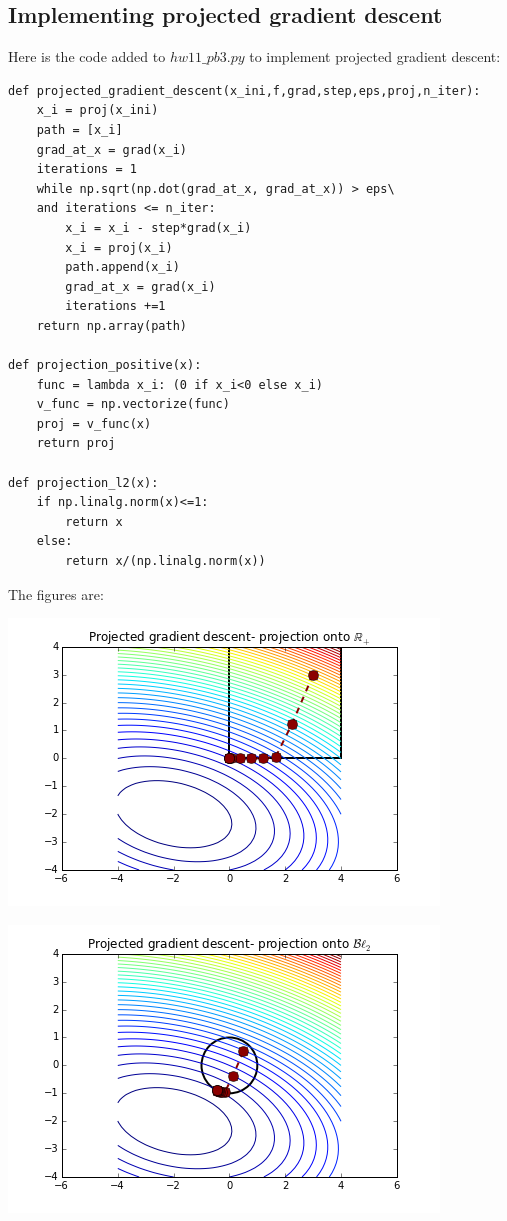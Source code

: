 \documentclass[paper=a4, fontsize=11pt]{scrartcl} %
\numberwithin{equation}{section} %
\numberwithin{figure}{section} %
\numberwithin{table}{section} %
\begin{document}
\subsection{Implementing projected gradient descent}

Here is the code added to $hw11\_pb3.py$ to implement projected gradient descent:
\begin{lstlisting}[frame=single, basicstyle=\small]
def projected_gradient_descent(x_ini,f,grad,step,eps,proj,n_iter):
    x_i = proj(x_ini)
    path = [x_i]
    grad_at_x = grad(x_i)
    iterations = 1
    while np.sqrt(np.dot(grad_at_x, grad_at_x)) > eps\
    and iterations <= n_iter:
        x_i = x_i - step*grad(x_i)
        x_i = proj(x_i)
        path.append(x_i)
        grad_at_x = grad(x_i)
        iterations +=1
    return np.array(path)

def projection_positive(x):
    func = lambda x_i: (0 if x_i<0 else x_i)
    v_func = np.vectorize(func)
    proj = v_func(x)
    return proj

def projection_l2(x):
    if np.linalg.norm(x)<=1:
        return x
    else:
        return x/(np.linalg.norm(x))
\end{lstlisting}

The figures are:

\includegraphics[scale = 1]{Q3Ci.png}

\includegraphics[scale = 1]{Q3Cii.png}
\end{document}
